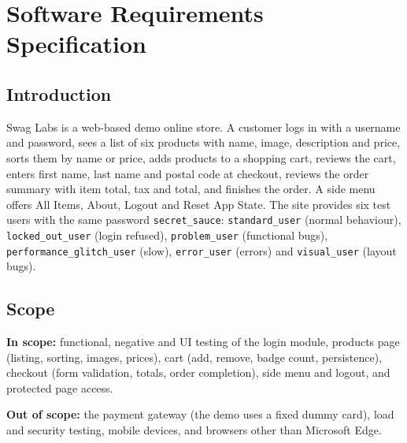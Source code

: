 \documentclass[12pt,a4paper]{article}
\begin{document}
\section{Software Requirements Specification}\label{sec:srs}
\subsection{Introduction}\label{sec:srs1}
Swag Labs is a web-based demo online store. A customer logs in with a username and password, sees a list of six products with name, image, description and price, sorts them by name or price, adds products to a shopping cart, reviews the cart, enters first name, last name and postal code at checkout, reviews the order summary with item total, tax and total, and finishes the order. A side menu offers All Items, About, Logout and Reset App State. The site provides six test users with the same password \texttt{secret\_sauce}: \texttt{standard\_user} (normal behaviour), \texttt{locked\_out\_user} (login refused), \texttt{problem\_user} (functional bugs), \texttt{performance\_glitch\_user} (slow), \texttt{error\_user} (errors) and \texttt{visual\_user} (layout bugs).

\subsection{Scope}\label{sec:srs2}
\textbf{In scope:} functional, negative and UI testing of the login module, products page (listing, sorting, images, prices), cart (add, remove, badge count, persistence), checkout (form validation, totals, order completion), side menu and logout, and protected page access.

\textbf{Out of scope:} the payment gateway (the demo uses a fixed dummy card), load and security testing, mobile devices, and browsers other than Microsoft Edge.
\end{document}
